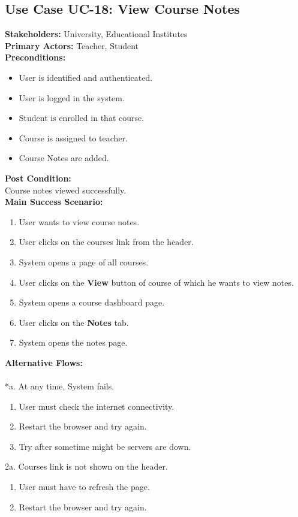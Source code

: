 \subsection{Use Case UC-18: View Course Notes}
\textbf{Stakeholders: } University, Educational Institutes \\
\textbf{Primary Actors: }Teacher, Student \\
\textbf{Preconditions:}
\begin{itemize}
\item User is identified and authenticated.
\item User is logged in the system.
\item Student is enrolled in that course.
\item Course is assigned to teacher.
\item Course Notes are added.
\end{itemize}
\textbf{Post Condition: }\\
Course notes viewed successfully.\\
\textbf{Main Success Scenario:}
\begin{enumerate}
\item User wants to view course notes.
\item User clicks on the courses link from the header.
\item System opens a page of all courses.
\item User clicks on the \textbf{View} button of course of which he wants to view notes.
\item System opens a course dashboard page.
\item User clicks on the \textbf{Notes} tab.
\item System opens the notes page.
\end{enumerate}
\textbf{Alternative Flows:}\\
\\
*a. At any time, System fails.
\begin{enumerate}
\item User must check the internet connectivity.
\item Restart the browser and try again.
\item Try after sometime might be servers are down.
\end{enumerate}
2a. Courses link is not shown on the header.
\begin{enumerate}
\item User must have to refresh the page.
\item Restart the browser and try again.
\end{enumerate} 
